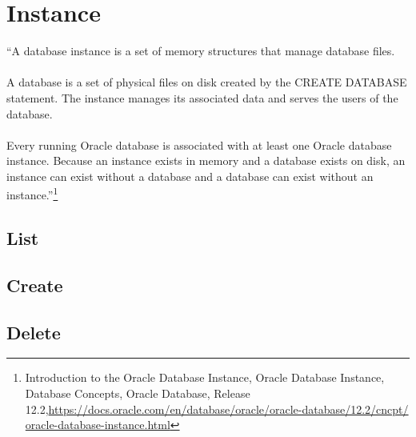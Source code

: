 
\newpage
\setcounter{secnumdepth}{0}

\section{Instance}

``A database instance is a set of memory structures that manage 
database files.\\
\\
A database is a set of physical files on disk created by the 
CREATE DATABASE statement.  The instance manages its associated 
data and serves the users of the database.\\
\\
Every running Oracle database is associated with at least one 
Oracle database instance.  Because an instance exists in memory
and a database exists on disk, an instance can exist without a 
database and a database can exist without an instance.''\footnote{Introduction to the Oracle Database Instance, Oracle Database Instance, Database Concepts, Oracle Database,
    Release 12.2,\href{https://docs.oracle.com/en/database/oracle/oracle-database/12.2/cncpt/oracle-database-instance.html}{https://docs.oracle.com/en/database/oracle/oracle-database/12.2/cncpt/}\newline
  \href{https://docs.oracle.com/en/database/oracle/oracle-database/12.2/cncpt/oracle-database-instance.html}{oracle-database-instance.html}}

\subsection{List}


\subsection{Create}


\subsection{Delete}
